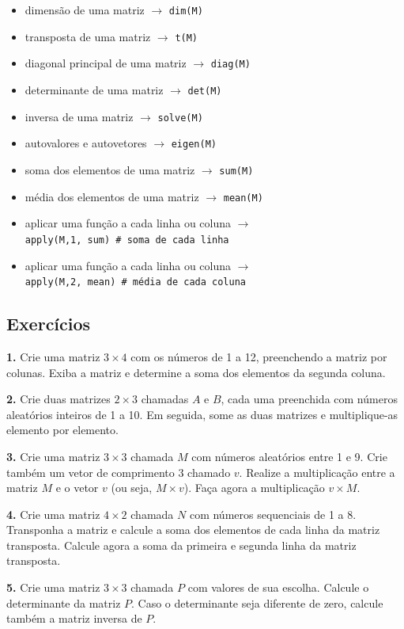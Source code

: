 \documentclass[
]{book}
\begin{document}
\begin{itemize}
\item
  dimensão de uma matriz \(\to\) \texttt{dim(M)}
\item
  transposta de uma matriz \(\to\) \texttt{t(M)}
\item
  diagonal principal de uma matriz \(\to\) \texttt{diag(M)}
\item
  determinante de uma matriz \(\to\) \texttt{det(M)}
\item
  inversa de uma matriz \(\to\) \texttt{solve(M)}
\item
  autovalores e autovetores \(\to\) \texttt{eigen(M)}
\item
  soma dos elementos de uma matriz \(\to\) \texttt{sum(M)}
\item
  média dos elementos de uma matriz \(\to\) \texttt{mean(M)}
\item
  aplicar uma função a cada linha ou coluna \(\to\)
  \texttt{apply(M,1,\ sum)\ \#\ soma\ de\ cada\ linha}
\item
  aplicar uma função a cada linha ou coluna \(\to\)
  \texttt{apply(M,2,\ mean)\ \#\ média\ de\ cada\ coluna}
\end{itemize}

\subsection{Exercícios}\label{exercuxedcios-3}

\textbf{1.} Crie uma matriz \(3 \times 4\) com os números de 1 a 12,
preenchendo a matriz por colunas. Exiba a matriz e determine a soma dos
elementos da segunda coluna.

\textbf{2.} Crie duas matrizes \(2 \times 3\) chamadas \(A\) e \(B\), cada uma
preenchida com números aleatórios inteiros de 1 a 10. Em seguida, some
as duas matrizes e multiplique-as elemento por elemento.

\textbf{3.} Crie uma matriz \(3 \times 3\) chamada \(M\) com números aleatórios
entre 1 e 9. Crie também um vetor de comprimento 3 chamado \(v\). Realize
a multiplicação entre a matriz \(M\) e o vetor \(v\) (ou seja,
\(M \times v\)). Faça agora a multiplicação \(v \times M\).

\textbf{4.} Crie uma matriz \(4 \times 2\) chamada \(N\) com números sequenciais
de 1 a 8. Transponha a matriz e calcule a soma dos elementos de cada
linha da matriz transposta. Calcule agora a soma da primeira e segunda
linha da matriz transposta.

\textbf{5.} Crie uma matriz \(3 \times 3\) chamada \(P\) com valores de sua
escolha. Calcule o determinante da matriz \(P\). Caso o determinante seja
diferente de zero, calcule também a matriz inversa de \(P\).
\end{document}
